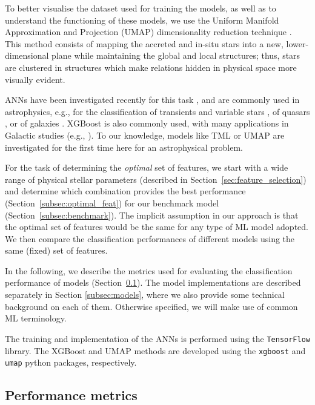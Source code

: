 To better visualise the dataset used for training the models, as well as to understand the functioning of these models, we use the Uniform Manifold Approximation and Projection (UMAP) dimensionality reduction technique \citep{McInnes2018b}. This method consists of mapping the accreted and in-situ stars into a new, lower-dimensional plane while maintaining the global and local structures; thus, stars are clustered in structures which make relations hidden in physical space more visually evident.

ANNs have been investigated recently for this task \citep{Ostdiek2020,Tronrud2022,TrujilloGomez2023}, and are commonly used in astrophysics, e.g., for the classification of transients and variable stars \citep{Jayasinghe2019,Agarwal2020,Chen2022}, of quasars \citep{Nakoneczny2019,Clarke2020,Nakoneczny2021}, or of galaxies \citep{Traven2017,DominguezSanchez2018,HuertasCompany2023}. XGBoost is also commonly used, with many applications in Galactic studies (e.g., \citealt{Anders2023}). To our knowledge, models like TML or UMAP are investigated for the first time here for an astrophysical problem.

For the task of determining the \textit{optimal} set of features, we start with a wide range of physical stellar parameters (described in Section~\ref{sec:feature_selection}) and determine which combination provides the best performance (Section~\ref{subsec:optimal_feat}) for our benchmark model (Section~\ref{subsec:benchmark}).
The implicit assumption in our approach is that the optimal set of features would be the same for any type of ML model adopted. We then compare the classification performances of different models using the same (fixed) set of features.

In the following, we describe the metrics used for evaluating the classification performance of models (Section~\ref{subsec:metrics}). The model implementations are described separately in Section \ref{subsec:models}, where we also provide some technical background on each of them. Otherwise specified, we will make use of common ML terminology.

The training and implementation of the ANNs is performed using the \texttt{TensorFlow} \citep{MartinAbadi2015} library. The XGBoost and UMAP methods are developed using the \texttt{xgboost} \citep{Chen2016} and \texttt{umap} \citep{McInnes2018a} python packages, respectively.

\subsection{Performance metrics}
\label{subsec:metrics}

